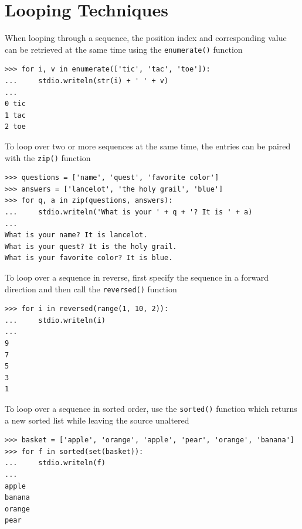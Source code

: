 \documentclass[8pt,a4paper,compress]{beamer}
\begin{document}
\section{Looping Techniques}
\begin{frame}[fragile]
\pause

When looping through a sequence, the position index and corresponding value can be retrieved at the same time using the \lstinline{enumerate()} function

\smallskip

\begin{lstlisting}[language={},style=focusin]
>>> for i, v in enumerate(['tic', 'tac', 'toe']):
...     stdio.writeln(str(i) + ' ' + v)
...
0 tic
1 tac
2 toe
\end{lstlisting}

\pause\bigskip

To loop over two or more sequences at the same time, the entries can be paired with the \lstinline{zip()} function 

\smallskip

\begin{lstlisting}[language={},style=focusin]
>>> questions = ['name', 'quest', 'favorite color']
>>> answers = ['lancelot', 'the holy grail', 'blue']
>>> for q, a in zip(questions, answers):
...     stdio.writeln('What is your ' + q + '? It is ' + a)
...
What is your name? It is lancelot.
What is your quest? It is the holy grail.
What is your favorite color? It is blue.
\end{lstlisting}
\end{frame}

\begin{frame}[fragile]
\pause

To loop over a sequence in reverse, first specify the sequence in a forward direction and then call the \lstinline{reversed()} function

\smallskip

\begin{lstlisting}[language={},style=focusin]
>>> for i in reversed(range(1, 10, 2)):
...     stdio.writeln(i)
...
9
7
5
3
1
\end{lstlisting}

\pause\bigskip

To loop over a sequence in sorted order, use the \lstinline{sorted()} function which returns a new sorted list while leaving the source unaltered

\smallskip

\begin{lstlisting}[language={},style=focusin]
>>> basket = ['apple', 'orange', 'apple', 'pear', 'orange', 'banana']
>>> for f in sorted(set(basket)):
...     stdio.writeln(f)
...
apple
banana
orange
pear
\end{lstlisting}
\end{frame}
\end{document}
